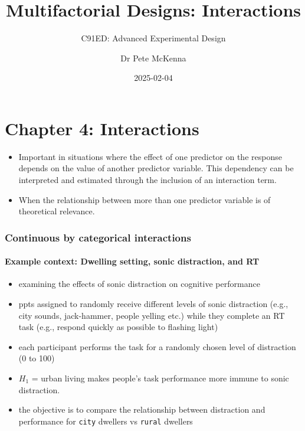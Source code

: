 \documentclass[
]{article}
\title{Multifactorial Designs: Interactions}
\subtitle{C91ED: Advanced Experimental Design}
\author{Dr Pete McKenna}
\date{2025-02-04}
\providecommand{\tightlist}{%
  \setlength{\itemsep}{0pt}\setlength{\parskip}{0pt}}
\begin{document}
\maketitle

\hypertarget{chapter-4-interactions}{%
\section{Chapter 4: Interactions}\label{chapter-4-interactions}}

\begin{itemize}
\tightlist
\item
  Important in situations where the effect of one predictor on the
  response depends on the value of another predictor variable. This
  dependency can be interpreted and estimated through the inclusion of
  an interaction term.
\item
  When the relationship between more than one predictor variable is of
  theoretical relevance.
\end{itemize}

\hypertarget{continuous-by-categorical-interactions}{%
\subsubsection{Continuous by categorical
interactions}\label{continuous-by-categorical-interactions}}

\hypertarget{example-context-dwelling-setting-sonic-distraction-and-rt}{%
\paragraph{Example context: Dwelling setting, sonic distraction, and
RT}\label{example-context-dwelling-setting-sonic-distraction-and-rt}}

\begin{itemize}
\tightlist
\item
  examining the effects of sonic distraction on cognitive performance
\item
  ppts assigned to randomly receive different levels of sonic
  distraction (e.g., city sounds, jack-hammer, people yelling etc.)
  while they complete an RT task (e.g., respond quickly as possible to
  flashing light)
\item
  each participant performs the task for a randomly chosen level of
  distraction (0 to 100)
\item
  \(H_{1}\) = urban living makes people's task performance more immune
  to sonic distraction.
\item
  the objective is to compare the relationship between distraction and
  performance for \texttt{city} dwellers vs \texttt{rural} dwellers
\end{itemize}
\end{document}
